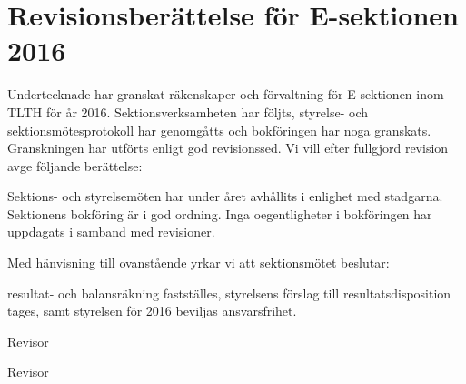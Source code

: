 \documentclass[../_main/handlingar.tex]{subfiles}
\begin{document}
\section{Revisionsberättelse för E-sektionen 2016}

Undertecknade har granskat räkenskaper och förvaltning för E-sektionen inom TLTH för år 2016. Sektionsverksamheten har följts, styrelse- och sektionsmötesprotokoll har genomgåtts och bokföringen har noga granskats. Granskningen har utförts enligt god revisionssed. Vi vill efter fullgjord
revision avge följande berättelse:

Sektions- och styrelsemöten har under året avhållits i enlighet med stadgarna. Sektionens bokföring är i god ordning. Inga oegentligheter i bokföringen har uppdagats i samband med revisioner.

Med hänvisning till ovanstående yrkar vi att sektionsmötet beslutar:

\begin{attsatser}
    \att resultat- och balansräkning fastställes,
    \att styrelsens förslag till resultatsdisposition tages, samt
    \att styrelsen för 2016 beviljas ansvarsfrihet.
\end{attsatser}

\begin{signatures}{2}
    \mvh
    \signature{Jesper Ek}{Revisor}
    \signature{Hanna Nevalainen}{Revisor}
\end{signatures}
\end{document}
